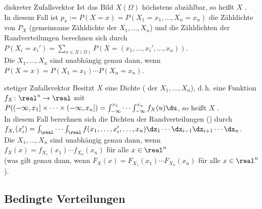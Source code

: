 \begin{Def}{diskreter Zufallsvektor}
    Ist das Bild $X(\Omega)$ höchstens abzählbar, so heißt $X$ .\\
    In diesem Fall ist $p_x := P(X = x) = P(X_1 = x_1, \dotsc, X_n = x_n)$ die
    Zähldichte von $P_X$ (gemeinsame Zähldichte der $X_1, \dotsc, X_n$) und
    die Zähldichten der Randverteilungen berechnen sich durch
    $P(X_i = x_i') = \sum_{x \in X(\Omega)} P(X = (x_1, \dotsc, x_i', \dotsc, x_n))$.\\
    Die $X_1, \dotsc, X_n$ sind unabhängig genau dann, wenn
    $P(X = x) = P(X_1 = x_1) \dotsm P(X_n = x_n)$.
\end{Def}

\begin{Def}{stetiger Zufallsvektor}
    Besitzt $X$ eine Dichte
    ( der $X_1, \dotsc, X_n$),
    d.\,h. eine Funktion $f_X\colon \real^n \rightarrow \real$ mit\\
    $P((-\infty, x_1] \times \dotsb \times (-\infty, x_n]) =
    \int_{-\infty}^{x_1} \dotsb \int_{-\infty}^{x_n} f_X(u)\du$,
    so heißt $X$ .\\
    In diesem Fall berechnen sich die Dichten der Randverteilungen () durch\\
    $f_{X_i}(x_i') = \int_\real \dotsb \int_\real
    f(x_1, \dotsc, x_i', \dotsc, x_n) \dx_1 \dotsb \dx_{i-1} \dx_{i+1} \dotsb \dx_n$.\\
    Die $X_1, \dotsc, X_n$ sind unabhängig genau dann, wenn
    $f_X(x) = f_{X_1}(x_1) \dotsm f_{X_n}(x_n)$ für alle $x \in \real^n$\\
    (was gilt genau dann, wenn $F_X(x) = F_{X_1}(x_1) \dotsm F_{X_n}(x_n)$
    für alle $x \in \real^n$).
\end{Def}

\pagebreak

\subsection{%
    Bedingte Verteilungen%
}


